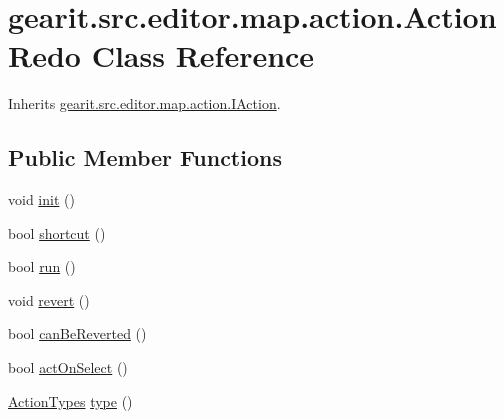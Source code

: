 \hypertarget{classgearit_1_1src_1_1editor_1_1map_1_1action_1_1_action_redo}{\section{gearit.\+src.\+editor.\+map.\+action.\+Action\+Redo Class Reference}
\label{classgearit_1_1src_1_1editor_1_1map_1_1action_1_1_action_redo}
}


Inherits \hyperlink{interfacegearit_1_1src_1_1editor_1_1map_1_1action_1_1_i_action}{gearit.\+src.\+editor.\+map.\+action.\+I\+Action}.

\subsection*{Public Member Functions}
\begin{DoxyCompactItemize}
\item 
void \hyperlink{classgearit_1_1src_1_1editor_1_1map_1_1action_1_1_action_redo_ac9ae1fa04e6b1ed3cbb935ff439de1f8}{init} ()
\item 
bool \hyperlink{classgearit_1_1src_1_1editor_1_1map_1_1action_1_1_action_redo_a0e87e80164cd6a749dc21d224a7cf604}{shortcut} ()
\item 
bool \hyperlink{classgearit_1_1src_1_1editor_1_1map_1_1action_1_1_action_redo_a21ce1cb8f3893866f70716b61e3d768e}{run} ()
\item 
void \hyperlink{classgearit_1_1src_1_1editor_1_1map_1_1action_1_1_action_redo_ababcde601e7af078e77f6b31f18910bf}{revert} ()
\item 
bool \hyperlink{classgearit_1_1src_1_1editor_1_1map_1_1action_1_1_action_redo_a5c57de7f567693c768248be58587544a}{can\+Be\+Reverted} ()
\item 
bool \hyperlink{classgearit_1_1src_1_1editor_1_1map_1_1action_1_1_action_redo_a7982b1496c8b7c71f4dce28cd9af811c}{act\+On\+Select} ()
\item 
\hyperlink{namespacegearit_1_1src_1_1editor_1_1map_1_1action_af036712a7d960b13d1e31954e65c00e3}{Action\+Types} \hyperlink{classgearit_1_1src_1_1editor_1_1map_1_1action_1_1_action_redo_a32032480984d34afb58ea4f1303c6540}{type} ()
\end{DoxyCompactItemize}


